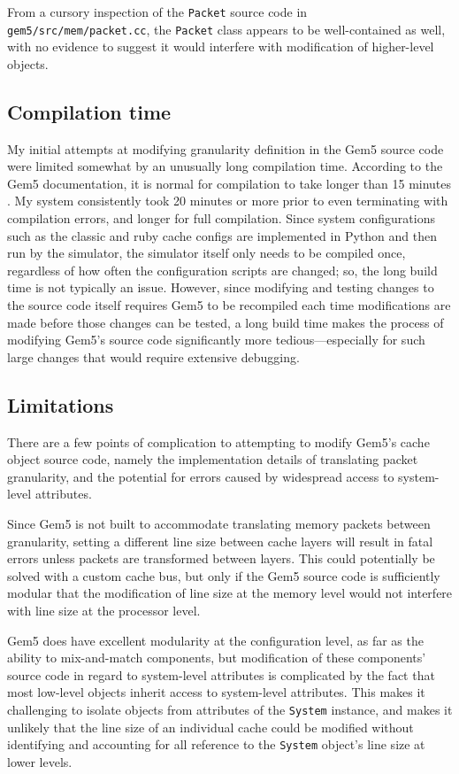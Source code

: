 \documentclass[12pt,twoside]{reedthesis}
\begin{document}
	From a cursory inspection of the \verb`Packet` source code in \verb`gem5/src/mem/packet.cc`, the \verb`Packet` class appears to be well-contained as well, with no evidence to suggest it would interfere with modification of higher-level objects.

	\subsection*{Compilation time}

	My initial attempts at modifying granularity definition in the Gem5 source code were limited somewhat by an unusually long compilation time. According to the Gem5 documentation, it is normal for compilation to take longer than 15 minutes \cite{gem5-build}. My system consistently took 20 minutes or more prior to even terminating with compilation errors, and longer for full compilation. Since system configurations such as the classic and ruby cache configs are implemented in Python and then run by the simulator, the simulator itself only needs to be compiled once, regardless of how often the configuration scripts are changed; so, the long build time is not typically an issue. However, since modifying and testing changes to the source code itself requires Gem5 to be recompiled each time modifications are made before those changes can be tested, a long build time makes the process of modifying Gem5's source code significantly more tedious---especially for such large changes that would require extensive debugging.

	\subsection*{Limitations}

	There are a few points of complication to attempting to modify Gem5's cache object source code, namely the implementation details of translating packet granularity, and the potential for errors caused by widespread access to system-level attributes.
	
	Since Gem5 is not built to accommodate translating memory packets between granularity, setting a different line size between cache layers will result in fatal errors unless packets are transformed between layers. This could potentially be solved with a custom cache bus, but only if the Gem5 source code is sufficiently modular that the modification of line size at the memory level would not interfere with line size at the processor level.
	
	Gem5 does have excellent modularity at the configuration level, as far as the ability to mix-and-match components, but modification of these components' source code in regard to system-level attributes is complicated by the fact that most low-level objects inherit access to system-level attributes. This makes it challenging to isolate objects from attributes of the \verb`System` instance, and makes it unlikely that the line size of an individual cache could be modified without identifying and accounting for all reference to the \verb`System` object's line size at lower levels.
\end{document}
